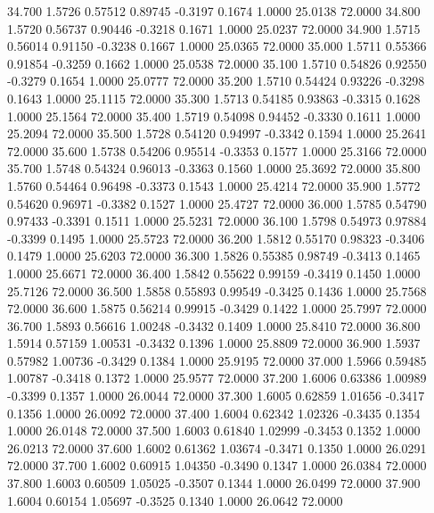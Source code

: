   34.700   1.5726   0.57512   0.89745  -0.3197   0.1674   1.0000  25.0138  72.0000
  34.800   1.5720   0.56737   0.90446  -0.3218   0.1671   1.0000  25.0237  72.0000
  34.900   1.5715   0.56014   0.91150  -0.3238   0.1667   1.0000  25.0365  72.0000
  35.000   1.5711   0.55366   0.91854  -0.3259   0.1662   1.0000  25.0538  72.0000
  35.100   1.5710   0.54826   0.92550  -0.3279   0.1654   1.0000  25.0777  72.0000
  35.200   1.5710   0.54424   0.93226  -0.3298   0.1643   1.0000  25.1115  72.0000
  35.300   1.5713   0.54185   0.93863  -0.3315   0.1628   1.0000  25.1564  72.0000
  35.400   1.5719   0.54098   0.94452  -0.3330   0.1611   1.0000  25.2094  72.0000
  35.500   1.5728   0.54120   0.94997  -0.3342   0.1594   1.0000  25.2641  72.0000
  35.600   1.5738   0.54206   0.95514  -0.3353   0.1577   1.0000  25.3166  72.0000
  35.700   1.5748   0.54324   0.96013  -0.3363   0.1560   1.0000  25.3692  72.0000
  35.800   1.5760   0.54464   0.96498  -0.3373   0.1543   1.0000  25.4214  72.0000
  35.900   1.5772   0.54620   0.96971  -0.3382   0.1527   1.0000  25.4727  72.0000
  36.000   1.5785   0.54790   0.97433  -0.3391   0.1511   1.0000  25.5231  72.0000
  36.100   1.5798   0.54973   0.97884  -0.3399   0.1495   1.0000  25.5723  72.0000
  36.200   1.5812   0.55170   0.98323  -0.3406   0.1479   1.0000  25.6203  72.0000
  36.300   1.5826   0.55385   0.98749  -0.3413   0.1465   1.0000  25.6671  72.0000
  36.400   1.5842   0.55622   0.99159  -0.3419   0.1450   1.0000  25.7126  72.0000
  36.500   1.5858   0.55893   0.99549  -0.3425   0.1436   1.0000  25.7568  72.0000
  36.600   1.5875   0.56214   0.99915  -0.3429   0.1422   1.0000  25.7997  72.0000
  36.700   1.5893   0.56616   1.00248  -0.3432   0.1409   1.0000  25.8410  72.0000
  36.800   1.5914   0.57159   1.00531  -0.3432   0.1396   1.0000  25.8809  72.0000
  36.900   1.5937   0.57982   1.00736  -0.3429   0.1384   1.0000  25.9195  72.0000
  37.000   1.5966   0.59485   1.00787  -0.3418   0.1372   1.0000  25.9577  72.0000
  37.200   1.6006   0.63386   1.00989  -0.3399   0.1357   1.0000  26.0044  72.0000
  37.300   1.6005   0.62859   1.01656  -0.3417   0.1356   1.0000  26.0092  72.0000
  37.400   1.6004   0.62342   1.02326  -0.3435   0.1354   1.0000  26.0148  72.0000
  37.500   1.6003   0.61840   1.02999  -0.3453   0.1352   1.0000  26.0213  72.0000
  37.600   1.6002   0.61362   1.03674  -0.3471   0.1350   1.0000  26.0291  72.0000
  37.700   1.6002   0.60915   1.04350  -0.3490   0.1347   1.0000  26.0384  72.0000
  37.800   1.6003   0.60509   1.05025  -0.3507   0.1344   1.0000  26.0499  72.0000
  37.900   1.6004   0.60154   1.05697  -0.3525   0.1340   1.0000  26.0642  72.0000
